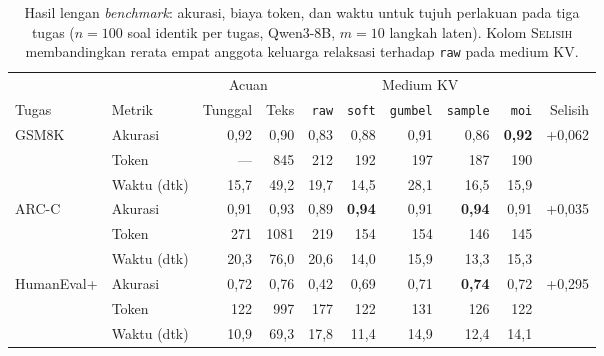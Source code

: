 \begin{table}[htbp]
\centering
\caption{Hasil lengan \textit{benchmark}: akurasi, biaya token, dan waktu untuk tujuh perlakuan pada tiga tugas ($n=100$ soal identik per tugas, Qwen3-8B, $m=10$ langkah laten). Kolom \textsc{Selisih} membandingkan rerata empat anggota keluarga relaksasi terhadap \texttt{raw} pada medium KV.}
\label{tab:hasil-bench}
\small
\begin{tabular}{llrrrrrrrr}
\hline
 & & \multicolumn{2}{c}{Acuan} & \multicolumn{5}{c}{Medium KV} & \\
\cline{3-4}\cline{5-9}
Tugas & Metrik & Tunggal & Teks & \texttt{raw} & \texttt{soft} & \texttt{gumbel} & \texttt{sample} & \texttt{moi} & Selisih \\
\hline
\multirow{3}{*}{GSM8K} & Akurasi & 0,92 & 0,90 & 0,83 & 0,88 & 0,91 & 0,86 & \textbf{0,92} & +0,062 \\
& Token & --- & 845 & 212 & 192 & 197 & 187 & 190 &  \\
& Waktu (dtk) & 15,7 & 49,2 & 19,7 & 14,5 & 28,1 & 16,5 & 15,9 &  \\
\hline
\multirow{3}{*}{ARC-C} & Akurasi & 0,91 & 0,93 & 0,89 & \textbf{0,94} & 0,91 & \textbf{0,94} & 0,91 & +0,035 \\
& Token & 271 & 1081 & 219 & 154 & 154 & 146 & 145 &  \\
& Waktu (dtk) & 20,3 & 76,0 & 20,6 & 14,0 & 15,9 & 13,3 & 15,3 &  \\
\hline
\multirow{3}{*}{HumanEval+} & Akurasi & 0,72 & 0,76 & 0,42 & 0,69 & 0,71 & \textbf{0,74} & 0,72 & +0,295 \\
& Token & 122 & 997 & 177 & 122 & 131 & 126 & 122 &  \\
& Waktu (dtk) & 10,9 & 69,3 & 17,8 & 11,4 & 14,9 & 12,4 & 14,1 &  \\
\hline
\end{tabular}
\end{table}
